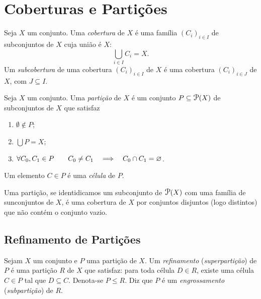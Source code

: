 \section{Coberturas e Partições}

\begin{defi}
Seja $X$ um conjunto. Uma \emph{cobertura} de $X$ é uma família $(C_i)_{i \in I}$ de subconjuntos de $X$ cuja união é $X$:
	\begin{equation*}
	\bigcup_{i \in I} C_i = X.
	\end{equation*}
Um \emph{subcobertura} de uma cobertura $(C_i)_{i \in I}$ de $X$ é uma cobertura $(C_i)_{i \in J}$ de $X$, com $J \subseteq I$.
\end{defi}

\begin{defi}
Seja $X$ um conjunto. Uma \emph{partição} de $X$ é um conjunto $P \subseteq \p(X)$ de subconjuntos de $X$ que satisfaz
	\begin{enumerate}
	\item $\emptyset \notin P$;
	\item $\displaystyle\bigcup P = X$;
	\item $\forall C_0,C_1 \in P \qquad C_0 \neq C_1 \quad \Longrightarrow \quad C_0 \cap C_1 = \varnothing$.
	\end{enumerate}
Um elemento $C \in P$ é uma \emph{célula} de $P$.
\end{defi}

Uma partição, se identidicamos um subconjunto de $\p(X)$ com uma família de sunconjuntos de $X$, é uma cobertura de $X$ por conjuntos disjuntos (logo distintos) que não contém o conjunto vazio.

\subsection{Refinamento de Partições}

\begin{defi}
Sejam $X$ um conjunto e $P$ uma partição de $X$. Um \emph{refinamento} (\emph{superpartição}) de $P$ é uma partição $R$ de $X$ que satisfaz: para toda célula $D \in R$, existe uma célula $C \in P$ tal que $D \subseteq C$. Denota-se $P \leq R$. Diz que $P$ é um \emph{engrossamento} (\emph{subpartição}) de $R$.
\end{defi}

